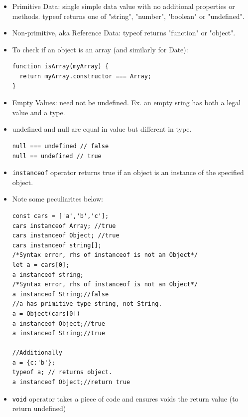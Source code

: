 \documentclass{report}
\begin{document}
\begin{itemize}
\item Primitive Data: single simple data value with no additional properties or methods. typeof returns one of "string", "number", "boolean" or "undefined".
\item Non-primitive, aka Reference Data: typeof returns "function" or "object".
\item To check if an object is an array (and similarly for Date):
\begin{lstlisting}
function isArray(myArray) {
  return myArray.constructor === Array;
}
\end{lstlisting}
\item Empty Values: need not be undefined. Ex. an empty sring has both a legal value and a type.
\item undefined and null are equal in value but different in type.
\begin{lstlisting}
null === undefined // false
null == undefined // true
\end{lstlisting}
\item \texttt{instanceof} operator returns true if an object is an instance of the specified object.
\item Note some peculiarites below:
\begin{lstlisting}
const cars = ['a','b','c'];
cars instanceof Array; //true
cars instanceof Object; //true
cars instanceof string[];
/*Syntax error, rhs of instanceof is not an Object*/
let a = cars[0];
a instanceof string;
/*Syntax error, rhs of instanceof is not an Object*/
a instanceof String;//false
//a has primitive type string, not String.
a = Object(cars[0])
a instanceof Object;//true
a instanceof String;//true

//Additionally
a = {c:'b'};
typeof a; // returns object.
a instanceof Object;//return true 
\end{lstlisting}
\item \texttt{void} operator takes a piece of code and ensures voids the return value (to return undefined)
\end{itemize}
\end{document}
